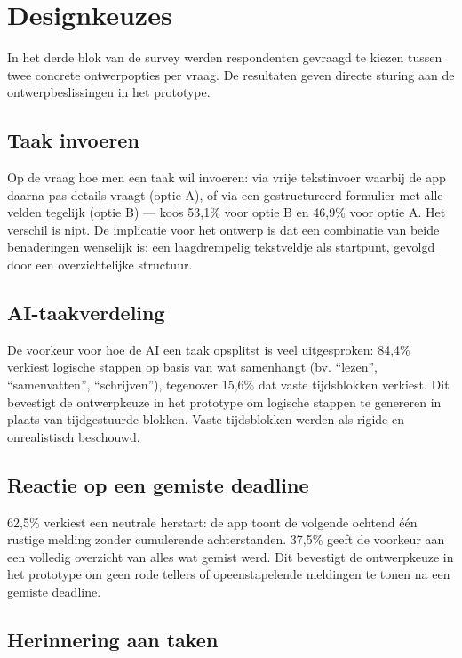 \section{Designkeuzes}

In het derde blok van de survey werden respondenten gevraagd te kiezen tussen
twee concrete ontwerpopties per vraag. De resultaten geven directe sturing aan
de ontwerpbeslissingen in het prototype.

\subsection{Taak invoeren}

Op de vraag hoe men een taak wil invoeren: via vrije tekstinvoer waarbij de app
daarna pas details vraagt (optie A), of via een gestructureerd formulier met
alle velden tegelijk (optie B) — koos 53,1\% voor optie B en 46,9\% voor optie
A. Het verschil is nipt. De implicatie voor het ontwerp is dat een combinatie
van beide benaderingen wenselijk is: een laagdrempelig tekstveldje als startpunt,
gevolgd door een overzichtelijke structuur.

\subsection{AI-taakverdeling}

De voorkeur voor hoe de AI een taak opsplitst is veel uitgesproken: 84,4\%
verkiest logische stappen op basis van wat samenhangt (bv. ``lezen'',
``samenvatten'', ``schrijven''), tegenover 15,6\% dat vaste tijdsblokken
verkiest. Dit bevestigt de ontwerpkeuze in het prototype om logische stappen
te genereren in plaats van tijdgestuurde blokken. Vaste tijdsblokken werden
als rigide en onrealistisch beschouwd.

\subsection{Reactie op een gemiste deadline}

62,5\% verkiest een neutrale herstart: de app toont de volgende ochtend één
rustige melding zonder cumulerende achterstanden. 37,5\% geeft de voorkeur
aan een volledig overzicht van alles wat gemist werd. Dit bevestigt de
ontwerpkeuze in het prototype om geen rode tellers of opeenstapelende
meldingen te tonen na een gemiste deadline.

\subsection{Herinnering aan taken}

